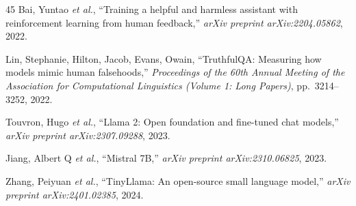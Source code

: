 \documentclass[journal]{IEEEtran}
\begin{document}
\begin{thebibliography}{45}
Bai, Yuntao \emph{et al.}, ``Training a helpful and harmless assistant with reinforcement learning from human feedback,'' \emph{arXiv preprint arXiv:2204.05862}, 2022.

Lin, Stephanie, Hilton, Jacob, Evans, Owain, ``TruthfulQA: Measuring how models mimic human falsehoods,'' \emph{Proceedings of the 60th Annual Meeting of the Association for Computational Linguistics (Volume 1: Long Papers)}, pp.~3214--3252, 2022.

Touvron, Hugo \emph{et al.}, ``Llama 2: Open foundation and fine-tuned chat models,'' \emph{arXiv preprint arXiv:2307.09288}, 2023.

Jiang, Albert Q \emph{et al.}, ``Mistral 7B,'' \emph{arXiv preprint arXiv:2310.06825}, 2023.

Zhang, Peiyuan \emph{et al.}, ``TinyLlama: An open-source small language model,'' \emph{arXiv preprint arXiv:2401.02385}, 2024.

\end{thebibliography}
\end{document}
